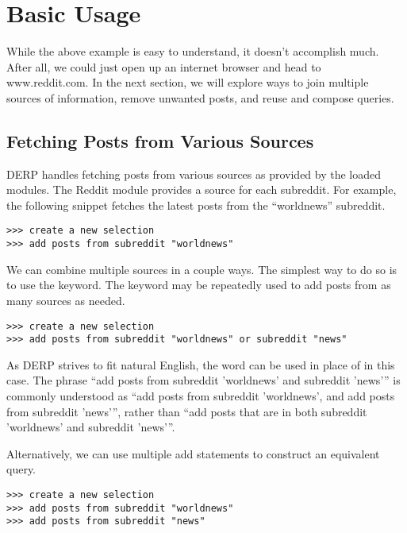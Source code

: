 \section{Basic Usage}
While the above example is easy to understand, it doesn’t accomplish much. After all, we could just open up an internet browser and head to www.reddit.com.
In the next section, we will explore ways to join multiple sources of information,  remove unwanted posts, and reuse and compose queries.

\subsection{Fetching Posts from Various Sources}

DERP handles fetching posts from various sources as provided by the loaded modules. The Reddit module provides a source for each subreddit. For example,
the following snippet fetches the latest posts from the “worldnews” subreddit.
\newline\begin{minipage}{\linewidth}\begin{lstlisting}
>>> create a new selection
>>> add posts from subreddit "worldnews"
\end{lstlisting}\end{minipage}
We can combine multiple sources in a couple ways. The simplest way to do so is to use the  keyword. The  keyword may be repeatedly used to add posts
from as many sources as needed.
\newline\begin{minipage}{\linewidth}\begin{lstlisting}
>>> create a new selection
>>> add posts from subreddit "worldnews" or subreddit "news"
\end{lstlisting}\end{minipage}
As DERP strives to fit natural English, the word  can be used in place of  in this case. The phrase “add posts from subreddit 'worldnews' and
subreddit 'news'” is commonly understood as “add posts from subreddit 'worldnews', and add posts from subreddit 'news'”, rather than “add posts that
are in both subreddit 'worldnews' and subreddit 'news'”.

Alternatively, we can use multiple add statements to construct an equivalent query.
\newline\begin{minipage}{\linewidth}\begin{lstlisting}
>>> create a new selection
>>> add posts from subreddit "worldnews"
>>> add posts from subreddit "news"
\end{lstlisting}\end{minipage}

